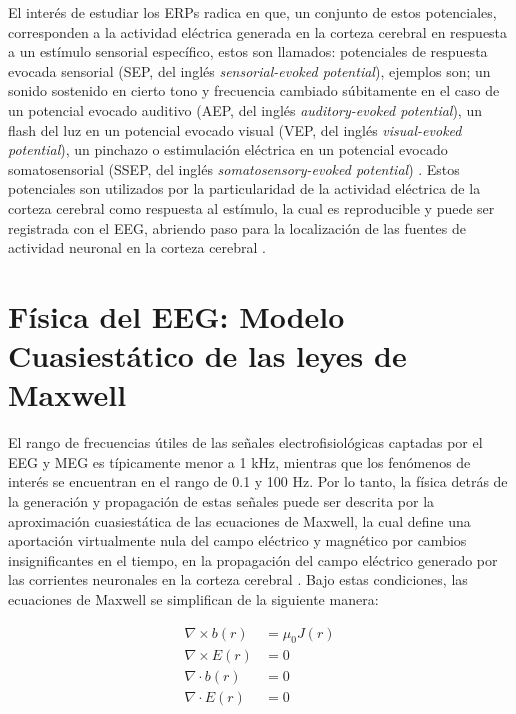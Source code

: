 El interés de estudiar los ERPs radica en que, un conjunto de estos potenciales, corresponden a la actividad eléctrica generada en la corteza cerebral en respuesta a un estímulo sensorial específico, estos son llamados: potenciales de respuesta evocada sensorial (SEP, del inglés \emph{sensorial-evoked potential}), ejemplos son; un sonido sostenido en cierto tono y frecuencia cambiado súbitamente en el caso de un potencial evocado auditivo (AEP, del inglés \emph{auditory-evoked potential}), un flash del luz en un potencial evocado visual (VEP, del inglés \emph{visual-evoked potential}), un pinchazo o estimulación eléctrica en un potencial evocado somatosensorial (SSEP, del inglés \emph{somatosensory-evoked potential}) \cite{kreutzerEncyclopediaClinicalNeuropsychology2011}. Estos potenciales son utilizados por la particularidad de la actividad eléctrica de la corteza cerebral como respuesta al estímulo, la cual es reproducible y puede ser registrada con el EEG, abriendo paso para la localización de las fuentes de actividad neuronal en la corteza cerebral \cite{luckIntroductionEventrelatedPotential2014}.

\section{Física del EEG: Modelo Cuasiestático de las leyes de Maxwell}
\label{sec:intro:physics}

El rango de frecuencias útiles de las señales electrofisiológicas captadas por el EEG y MEG es típicamente menor a 1 kHz, mientras que los fenómenos de interés se encuentran en el rango de 0.1 y 100 Hz. Por lo tanto, la física detrás de la generación y propagación de estas señales puede ser descrita por la aproximación cuasiestática de las ecuaciones de Maxwell, la cual define una aportación virtualmente nula del campo eléctrico y magnético por cambios insignificantes en el tiempo, en la propagación del campo eléctrico generado por las corrientes neuronales en la corteza cerebral \cite{Hamalainen1993, Plonsey1967}. Bajo estas condiciones, las ecuaciones de Maxwell se simplifican de la siguiente manera:

\begin{align}
	\nabla \times b(r) & = \mu_{0} J (r) \label{eq:Maxwell} \\
	\nabla \times E(r) & = 0 \label{eq:Maxwell2}            \\
	\nabla \cdot b(r)  & = 0 \label{eq:Maxwell3}            \\
	\nabla \cdot E(r)  & = 0 \label{eq:Maxwell4}
\end{align}

